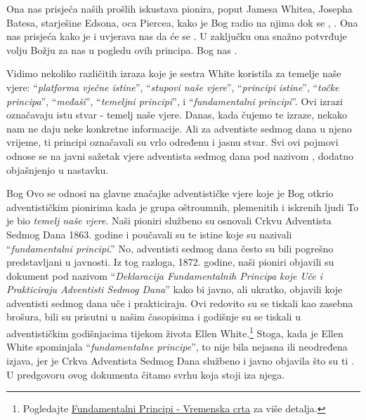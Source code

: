 Ona nas prisjeća naših prošlih iskustava pionira, poput Jamesa Whitea, Josepha Batesa, starješine Edsona, oca Piercea, kako je Bog radio na njima dok se , . Ona nas prisjeća kako je  i uvjerava nas da će se . U zaključku ona snažno potvrđuje volju Božju za nas u pogledu ovih principa. Bog nas .

Vidimo nekoliko različitih izraza koje je sestra White koristila za temelje naše vjere: “\textit{platforma vječne istine}”, “\textit{stupovi naše vjere}”, “\textit{principi istine}”, “\textit{točke principa}”, “\textit{međaši}”, “\textit{temeljni principi}”, i “\textit{fundamentalni principi}”. Ovi izrazi označavaju istu stvar - temelj naše vjere. Danas, kada čujemo te izraze, nekako nam ne daju neke konkretne informacije. Ali za adventiste sedmog dana u njeno vrijeme, ti principi označavali su vrlo određenu i jasnu stvar. Svi ovi pojmovi odnose se na javni sažetak vjere adventista sedmog dana pod nazivom , dodatno objašnjenjo u nastavku.

Bog  Ovo se odnosi na glavne značajke adventističke vjere koje je Bog otkrio adventističkim pionirima  kada je grupa oštroumnih, plemenitih i iskrenih ljudi  To je bio \textit{temelj naše vjere}. Naši pioniri službeno su osnovali Crkvu Adventista Sedmog Dana 1863. godine i poučavali su te istine koje su nazivali “\textit{fundamentalni principi}.” No, adventisti sedmog dana često su bili pogrešno predstavljani u javnosti. Iz tog razloga, 1872. godine, naši pioniri objavili su dokument pod nazivom “\textit{Deklaracija Fundamentalnih Principa koje Uče i Prakticiraju Adventisti Sedmog Dana}” kako bi javno, ali ukratko, objavili koje  adventisti sedmog dana uče i prakticiraju. Ovi  redovito su se tiskali kao zasebna brošura, bili su prisutni u našim časopisima i godišnje su se tiskali u adventističkim godišnjacima tijekom života Ellen White.\footnote{Pogledajte \hyperref[appendix:timeline]{Fundamentalni Principi - Vremenska crta} za više detalja.} Stoga, kada je Ellen White spominjala “\textit{fundamentalne principe}”, to nije bila nejasna ili neodređena izjava, jer je Crkva Adventista Sedmog Dana službeno i javno objavila što su ti . U predgovoru ovog dokumenta čitamo svrhu koja stoji iza njega.

